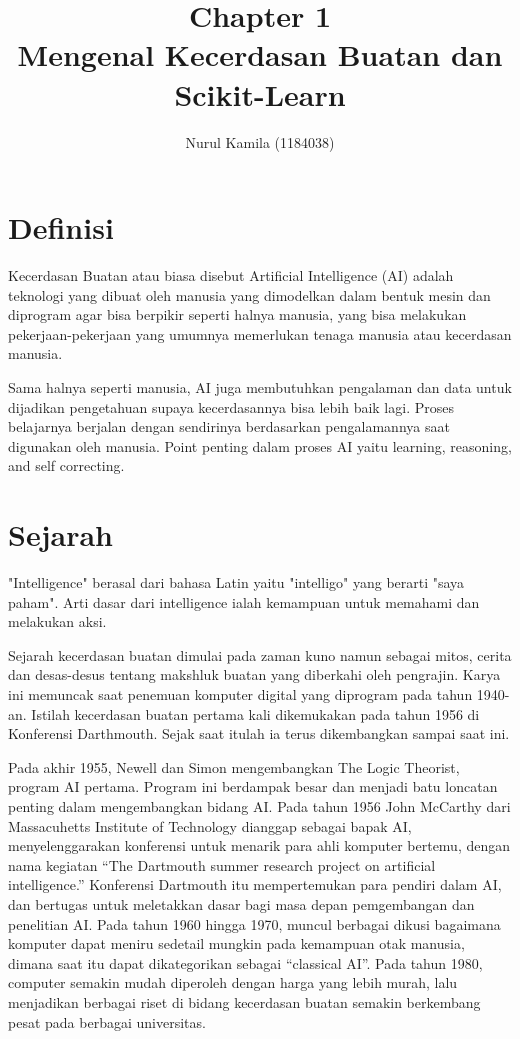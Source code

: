 \documentclass{homework}
\title{Chapter 1 \\
Mengenal Kecerdasan Buatan dan
Scikit-Learn}
\author{Nurul Kamila (1184038)}
\begin{document}
\maketitle 
\section{Definisi}
Kecerdasan Buatan atau biasa disebut Artificial Intelligence (AI) adalah teknologi yang dibuat oleh manusia yang dimodelkan dalam bentuk mesin dan diprogram agar bisa berpikir seperti halnya manusia, yang bisa melakukan pekerjaan-pekerjaan yang umumnya memerlukan tenaga manusia atau kecerdasan manusia. 

Sama halnya seperti manusia, AI juga membutuhkan pengalaman dan data untuk dijadikan pengetahuan supaya kecerdasannya bisa lebih baik lagi. Proses belajarnya berjalan dengan sendirinya berdasarkan pengalamannya saat digunakan oleh manusia. Point penting dalam proses AI yaitu learning, reasoning, and self correcting.

\section{Sejarah}
"Intelligence" berasal dari bahasa Latin yaitu "intelligo" yang berarti "saya paham". Arti dasar dari intelligence ialah kemampuan untuk memahami dan melakukan aksi.

Sejarah kecerdasan buatan dimulai pada zaman kuno namun sebagai mitos, cerita dan desas-desus tentang makshluk buatan yang diberkahi oleh pengrajin. Karya ini memuncak saat penemuan komputer digital yang diprogram pada tahun 1940-an.
Istilah kecerdasan buatan pertama kali dikemukakan pada tahun 1956 di Konferensi Darthmouth. Sejak saat itulah ia terus dikembangkan sampai saat ini.

Pada akhir 1955, Newell dan Simon mengembangkan  The Logic Theorist, program AI pertama. Program ini berdampak besar dan menjadi batu loncatan penting dalam mengembangkan bidang AI. Pada tahun 1956 John McCarthy dari  Massacuhetts Institute of Technology dianggap sebagai bapak AI, menyelenggarakan konferensi untuk menarik para ahli komputer bertemu, dengan  nama kegiatan “The Dartmouth summer research project on artificial intelligence.”   Konferensi Dartmouth itu mempertemukan para pendiri dalam AI, dan bertugas untuk meletakkan dasar bagi masa depan  pemgembangan dan penelitian AI. Pada  tahun 1960 hingga 1970, muncul berbagai dikusi bagaimana komputer dapat meniru sedetail mungkin pada kemampuan otak manusia, dimana saat itu dapat dikategorikan sebagai “classical AI”. Pada tahun 1980, computer semakin mudah diperoleh dengan harga yang lebih murah, lalu menjadikan berbagai riset di bidang kecerdasan buatan semakin berkembang pesat pada berbagai universitas.
\end{document}
